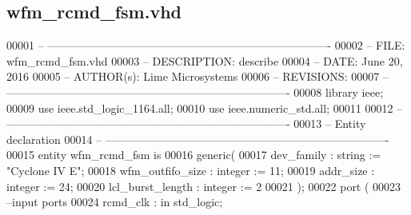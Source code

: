 \subsection{wfm\+\_\+rcmd\+\_\+fsm.\+vhd}
\label{wfm__rcmd__fsm_8vhd_source}

\begin{DoxyCode}
00001 \textcolor{keyword}{-- ---------------------------------------------------------------------------- }
00002 \textcolor{keyword}{-- FILE:    wfm\_rcmd\_fsm.vhd}
00003 \textcolor{keyword}{-- DESCRIPTION: describe}
00004 \textcolor{keyword}{-- DATE:    June 20, 2016}
00005 \textcolor{keyword}{-- AUTHOR(s):   Lime Microsystems}
00006 \textcolor{keyword}{-- REVISIONS:}
00007 \textcolor{keyword}{-- ---------------------------------------------------------------------------- }
00008 \textcolor{vhdlkeyword}{library }\textcolor{keywordflow}{ieee};
00009 \textcolor{vhdlkeyword}{use }ieee.std\_logic\_1164.\textcolor{keywordflow}{all};
00010 \textcolor{vhdlkeyword}{use }ieee.numeric\_std.\textcolor{keywordflow}{all};
00011 
00012 \textcolor{keyword}{-- ----------------------------------------------------------------------------}
00013 \textcolor{keyword}{-- Entity declaration}
00014 \textcolor{keyword}{-- ----------------------------------------------------------------------------}
00015 \textcolor{keywordflow}{entity }wfm_rcmd_fsm \textcolor{keywordflow}{is}
00016     \textcolor{keywordflow}{generic}\textcolor{vhdlchar}{(}
00017             \textcolor{vhdlchar}{dev_family}          \textcolor{vhdlchar}{:} \textcolor{comment}{string}  \textcolor{vhdlchar}{:=} \textcolor{keyword}{"Cyclone IV E"}; 
00018             \textcolor{vhdlchar}{wfm_outfifo_size}    \textcolor{vhdlchar}{:} \textcolor{comment}{integer} \textcolor{vhdlchar}{:=} \textcolor{vhdllogic}{}\textcolor{vhdllogic}{11};
00019             \textcolor{vhdlchar}{addr_size}           \textcolor{vhdlchar}{:} \textcolor{comment}{integer} \textcolor{vhdlchar}{:=} \textcolor{vhdllogic}{}\textcolor{vhdllogic}{24};
00020             \textcolor{vhdlchar}{lcl_burst_length}    \textcolor{vhdlchar}{:} \textcolor{comment}{integer} \textcolor{vhdlchar}{:=} \textcolor{vhdllogic}{}\textcolor{vhdllogic}{2}
00021 \textcolor{vhdlchar}{)};
00022   \textcolor{keywordflow}{port} \textcolor{vhdlchar}{(}
00023 \textcolor{keyword}{      --input ports }
00024         \textcolor{vhdlchar}{rcmd_clk}                    \textcolor{vhdlchar}{:} \textcolor{keywordflow}{in} \textcolor{comment}{std\_logic};

\end{DoxyCode}
